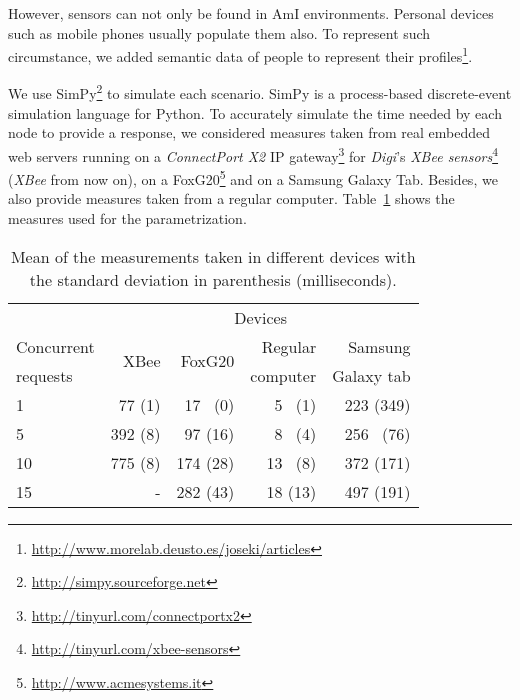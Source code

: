 However, sensors can not only be found in AmI environments.
Personal devices such as mobile phones usually populate them also.
To represent such circumstance, we added semantic data of people to represent their profiles\footnote{\url{http://www.morelab.deusto.es/joseki/articles}}. %

We use SimPy\footnote{\url{http://simpy.sourceforge.net}} to simulate each scenario.
SimPy is a process-based discrete-event simulation language for Python.
To accurately simulate the time needed by each node to provide a response, we considered measures taken from
real embedded web servers running on a \textit{ConnectPort X2} IP gateway\footnote{\url{http://tinyurl.com/connectportx2}} for \textit{Digi}'s \textit{XBee sensors}\footnote{\url{http://tinyurl.com/xbee-sensors}} (\textit{XBee} from now on),
on a FoxG20\footnote{\url{http://www.acmesystems.it}} and on a Samsung Galaxy Tab.
Besides, we also provide measures taken from a regular computer.
Table~\ref{tab:measures_embedded} shows the measures used for the parametrization.


\begin{table}
  \begin{center}
	\begin{tabular}{p{2.5cm} r r r r}
	  \hline
	  & \multicolumn{4}{c}{Devices} \\
	  \cline{2-5}
	  Concurrent & \multirow{2}{*}{XBee} & \multirow{2}{*}{FoxG20} & Regular  & Samsung \\
	  requests   &  ~    &   ~     & computer & Galaxy tab \\
	  \hline
	  1  &  77 (1)	&  17 ~(0)  &   5 ~(1)  &  223 (349) \\
	  5  & 392 (8)	&  97 (16) &   8 ~(4)  &  256 ~(76)  \\
	  10 & 775 (8)	& 174 (28) &  13 ~(8)  &  372 (171) \\
	  15 &  -   	& 282 (43) &  18 (13) &  497 (191) \\
	  \hline
	\end{tabular}
  \end{center}
  \caption{Mean of the measurements taken in different devices with the standard deviation in parenthesis (milliseconds).}
  \label{tab:measures_embedded}
\end{table}


